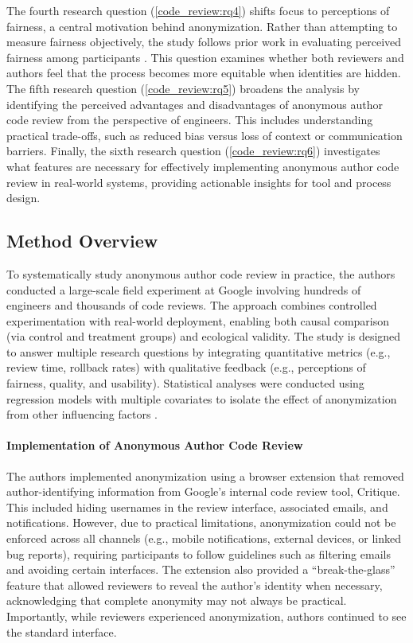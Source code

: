 The fourth research question (\ref{code_review:rq4}) shifts focus to perceptions of fairness, a central motivation behind anonymization. Rather than attempting to measure fairness objectively, the study follows prior work in evaluating perceived fairness among participants \cite{mcNutt1990effects,ware2008peer}. This question examines whether both reviewers and authors feel that the process becomes more equitable when identities are hidden. The fifth research question (\ref{code_review:rq5}) broadens the analysis by identifying the perceived advantages and disadvantages of anonymous author code review from the perspective of engineers. This includes understanding practical trade-offs, such as reduced bias versus loss of context or communication barriers. Finally, the sixth research question (\ref{code_review:rq6}) investigates what features are necessary for effectively implementing anonymous author code review in real-world systems, providing actionable insights for tool and process design.

\subsection{Method Overview}
To systematically study anonymous author code review in practice, the authors conducted a large-scale field experiment at Google involving hundreds of engineers and thousands of code reviews. The approach combines controlled experimentation with real-world deployment, enabling both causal comparison (via control and treatment groups) and ecological validity. The study is designed to answer multiple research questions by integrating quantitative metrics (e.g., review time, rollback rates) with qualitative feedback (e.g., perceptions of fairness, quality, and usability). Statistical analyses were conducted using regression models with multiple covariates to isolate the effect of anonymization from other influencing factors .

\paragraph{Implementation of Anonymous Author Code Review}
The authors implemented anonymization using a browser extension that removed author-identifying information from Google’s internal code review tool, Critique. This included hiding usernames in the review interface, associated emails, and notifications. However, due to practical limitations, anonymization could not be enforced across all channels (e.g., mobile notifications, external devices, or linked bug reports), requiring participants to follow guidelines such as filtering emails and avoiding certain interfaces. The extension also provided a “break-the-glass” feature that allowed reviewers to reveal the author’s identity when necessary, acknowledging that complete anonymity may not always be practical. Importantly, while reviewers experienced anonymization, authors continued to see the standard interface.

